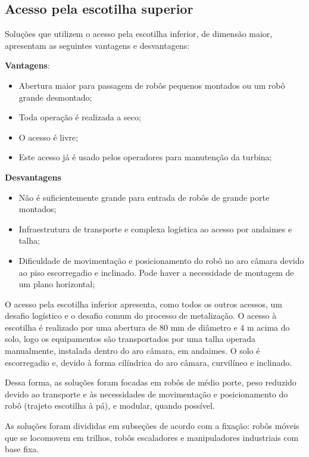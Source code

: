\subsection{Acesso pela escotilha superior}
Soluções que utilizem o acesso pela escotilha inferior, de dimensão maior,
apresentam as seguintes vantagens e desvantagens:

\textbf{Vantagens}:
\begin{itemize}
  \item Abertura maior para passagem de robôs pequenos montados ou um robô
  grande desmontado;
  \item Toda operação é realizada a seco;
  \item O acesso é livre;
  \item Este acesso já é usado pelos operadores para manutenção da turbina;
\end{itemize}

\textbf{Desvantagens}
\begin{itemize}
  \item Não é suficientemente grande para entrada de robôs de grande
  porte montados;
  \item Infraestrutura de transporte e complexa logística ao acesso por
  andaimes e talha;
  \item Dificuldade de movimentação e posicionamento do robô no aro câmara
  devido ao piso escorregadio e inclinado. Pode haver a necessidade de montagem
  de um plano horizontal; 
\end{itemize}

O acesso pela escotilha inferior apresenta, como todos os outros
acessos, um desafio logístico e o desafio comum do processo de metalização. O
acesso à escotilha é realizado por uma abertura de 80 mm de diâmetro e 4 m acima
do solo, logo os equipamentos são transportados por uma talha operada manualmente,
instalada dentro do aro câmara, em andaimes. O solo é escorregadio e, devido à
forma cilíndrica do aro câmara, curvilíneo e inclinado.

Dessa forma, as soluções foram focadas em robôs de médio porte, peso reduzido
devido ao transporte e às necessidades de movimentação e posicionamento do robô
(trajeto escotilha à pá), e modular, quando possível.

As soluções foram divididas em subseções de acordo com a fixação:
robôs móveis que se locomovem em trilhos, robôs escaladores e manipuladores
industriais com base fixa. 




 
%